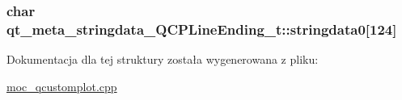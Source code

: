 \subsubsection[{\texorpdfstring{stringdata0}{stringdata0}}]{\setlength{\rightskip}{0pt plus 5cm}char qt\+\_\+meta\+\_\+stringdata\+\_\+\+Q\+C\+P\+Line\+Ending\+\_\+t\+::stringdata0\mbox{[}124\mbox{]}}\hypertarget{structqt__meta__stringdata___q_c_p_line_ending__t_a20c616613071fe30d8f5bcf67c6851b2}{}\label{structqt__meta__stringdata___q_c_p_line_ending__t_a20c616613071fe30d8f5bcf67c6851b2}


Dokumentacja dla tej struktury została wygenerowana z pliku\+:\begin{DoxyCompactItemize}
\item 
\hyperlink{moc__qcustomplot_8cpp}{moc\+\_\+qcustomplot.\+cpp}\end{DoxyCompactItemize}
